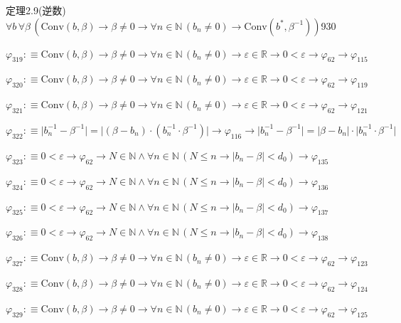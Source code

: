 \begin{fullproof}{定理2.9(逆数)}{$\forall b\,\forall \beta\,(\mathrm{Conv}(b,\beta) \to \beta \neq 0 \to \forall n \in \mathbb{N}\,(b_{n} \neq 0) \to \mathrm{Conv}(b^{\ast},\beta^{-1}))$}{930}
\begin{abbrevlist}
\item $\varphi_{319} :\equiv \mathrm{Conv}(b,\beta) \to \beta \neq 0 \to \forall n \in \mathbb{N}\,(b_{n} \neq 0) \to \varepsilon \in \mathbb{R} \to 0 < \varepsilon \to \varphi_{62} \to \varphi_{115}$
\item $\varphi_{320} :\equiv \mathrm{Conv}(b,\beta) \to \beta \neq 0 \to \forall n \in \mathbb{N}\,(b_{n} \neq 0) \to \varepsilon \in \mathbb{R} \to 0 < \varepsilon \to \varphi_{62} \to \varphi_{119}$
\item $\varphi_{321} :\equiv \mathrm{Conv}(b,\beta) \to \beta \neq 0 \to \forall n \in \mathbb{N}\,(b_{n} \neq 0) \to \varepsilon \in \mathbb{R} \to 0 < \varepsilon \to \varphi_{62} \to \varphi_{121}$
\item $\varphi_{322} :\equiv \lvert b_{n}^{-1} - \beta^{-1} \rvert = \lvert (\beta - b_{n}) \cdot (b_{n}^{-1} \cdot \beta^{-1}) \rvert \to \varphi_{116} \to \lvert b_{n}^{-1} - \beta^{-1} \rvert = \lvert \beta - b_{n} \rvert \cdot \lvert b_{n}^{-1} \cdot \beta^{-1} \rvert$
\item $\varphi_{323} :\equiv 0 < \varepsilon \to \varphi_{62} \to N \in \mathbb{N} \land \forall n \in \mathbb{N}\,(N \leq n \to \lvert b_{n} - \beta \rvert < d_{0}) \to \varphi_{135}$
\item $\varphi_{324} :\equiv 0 < \varepsilon \to \varphi_{62} \to N \in \mathbb{N} \land \forall n \in \mathbb{N}\,(N \leq n \to \lvert b_{n} - \beta \rvert < d_{0}) \to \varphi_{136}$
\item $\varphi_{325} :\equiv 0 < \varepsilon \to \varphi_{62} \to N \in \mathbb{N} \land \forall n \in \mathbb{N}\,(N \leq n \to \lvert b_{n} - \beta \rvert < d_{0}) \to \varphi_{137}$
\item $\varphi_{326} :\equiv 0 < \varepsilon \to \varphi_{62} \to N \in \mathbb{N} \land \forall n \in \mathbb{N}\,(N \leq n \to \lvert b_{n} - \beta \rvert < d_{0}) \to \varphi_{138}$
\item $\varphi_{327} :\equiv \mathrm{Conv}(b,\beta) \to \beta \neq 0 \to \forall n \in \mathbb{N}\,(b_{n} \neq 0) \to \varepsilon \in \mathbb{R} \to 0 < \varepsilon \to \varphi_{62} \to \varphi_{123}$
\item $\varphi_{328} :\equiv \mathrm{Conv}(b,\beta) \to \beta \neq 0 \to \forall n \in \mathbb{N}\,(b_{n} \neq 0) \to \varepsilon \in \mathbb{R} \to 0 < \varepsilon \to \varphi_{62} \to \varphi_{124}$
\item $\varphi_{329} :\equiv \mathrm{Conv}(b,\beta) \to \beta \neq 0 \to \forall n \in \mathbb{N}\,(b_{n} \neq 0) \to \varepsilon \in \mathbb{R} \to 0 < \varepsilon \to \varphi_{62} \to \varphi_{125}$

\end{abbrevlist}
\end{fullproof}
